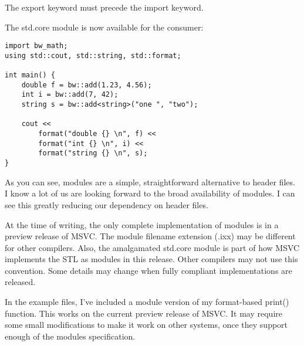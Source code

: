 \begin{itemize}
The export keyword must precede the import keyword.

The std.core module is now available for the consumer:

\begin{lstlisting}[style=styleCXX]
import bw_math;
using std::cout, std::string, std::format;

int main() {
	double f = bw::add(1.23, 4.56);
	int i = bw::add(7, 42);
	string s = bw::add<string>("one ", "two");
	
	cout <<
		format("double {} \n", f) <<
		format("int {} \n", i) <<
		format("string {} \n", s);
}
\end{lstlisting}

\end{itemize}

As you can see, modules are a simple, straightforward alternative to header files. I know a lot of us are looking forward to the broad availability of modules. I can see this greatly reducing our dependency on header files.

\begin{tcolorbox}[colback=webgreen!5!white,colframe=webgreen!75!black,title=Note]
At the time of writing, the only complete implementation of modules is in a preview release of MSVC. The module filename extension (.ixx) may be different for other compilers. Also, the amalgamated std.core module is part of how MSVC implements the STL as modules in this release. Other compilers may not use this convention. Some details may change when fully compliant implementations are released.
\end{tcolorbox}

In the example files, I've included a module version of my format-based print() function. This works on the current preview release of MSVC. It may require some small modifications to make it work on other systems, once they support enough of the modules specification.
